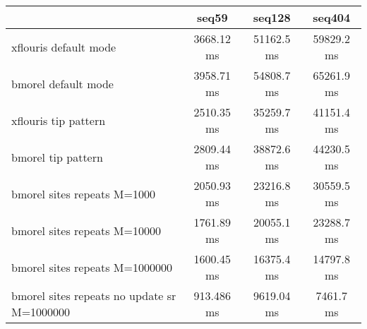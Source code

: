 \begin{tabular}{|l|c|c|c|}
\hline
 & seq59 & seq128 & seq404  \\
\hline
xflouris default mode & 3668.12 ms & 51162.5 ms & 59829.2 ms\\
\hline
bmorel default mode & 3958.71 ms & 54808.7 ms & 65261.9 ms\\
\hline
xflouris tip pattern & 2510.35 ms & 35259.7 ms & 41151.4 ms\\
\hline
bmorel tip pattern & 2809.44 ms & 38872.6 ms & 44230.5 ms\\
\hline
bmorel sites repeats M=1000 & 2050.93 ms & 23216.8 ms & 30559.5 ms\\
\hline
bmorel sites repeats M=10000 & 1761.89 ms & 20055.1 ms & 23288.7 ms\\
\hline
bmorel sites repeats M=1000000 & 1600.45 ms & 16375.4 ms & 14797.8 ms\\
\hline
bmorel sites repeats no update sr  M=1000000 & 913.486 ms & 9619.04 ms & 7461.7 ms\\
\hline
\end{tabular}

